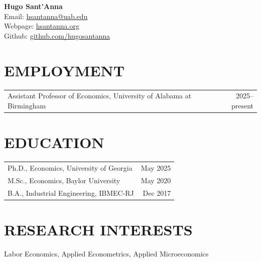 \documentclass[11pt,letterpaper]{article}
\begin{document}
\thispagestyle{firstpage}

\begin{center}
    {\LARGE \textbf{Hugo Sant'Anna}} \\[6pt]
    Email: \href{mailto:hsantanna@uab.edu}{hsantanna@uab.edu} \\
    Webpage: \href{https://hsantanna.org}{hsantanna.org} \\
    Github: \href{https://github.com/hugosantanna}{github.com/hugosantanna}
\end{center}

\vspace{8pt}

\section*{EMPLOYMENT}
\begin{tabularx}{\textwidth}{Xr}
    Assistant Professor of Economics, University of Alabama at Birmingham & 2025--present \\
\end{tabularx}

\section*{EDUCATION}
\begin{tabularx}{\textwidth}{Xr}
    Ph.D., Economics, University of Georgia & May 2025 \\
    M.Sc., Economics, Baylor University & May 2020 \\
    B.A., Industrial Engineering, IBMEC-RJ & Dec 2017 \\
\end{tabularx}

\section*{RESEARCH INTERESTS}
\hspace*{2em} Labor Economics, Applied Econometrics, Applied Microeconomics
\end{document}

